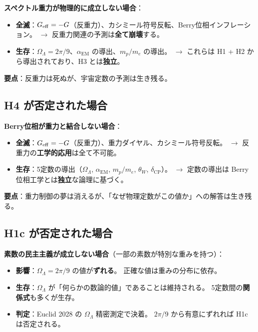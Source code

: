 \begin{warningbox}[H3否定の波及]
\textbf{スペクトル重力が物理的に成立しない場合}：
\begin{itemize}
  \item \textbf{全滅}：$G_{\mathrm{eff}} = -G$（反重力）、カシミール符号反転、Berry位相インフレーション。
        $\to$ 反重力関連の予測は\textbf{全て崩壊}する。
  \item \textbf{生存}：$\Omega_\Lambda = 2\pi/9$、$\alpha_{\mathrm{EM}}$ の導出、$m_p/m_e$ の導出。
        $\to$ これらは H1 + H2 から導出されており、H3 とは\textbf{独立}。
\end{itemize}
\textbf{要点}：反重力は死ぬが、宇宙定数の予測は生き残る。
\end{warningbox}

\subsection{H4 が否定された場合}

\begin{warningbox}[H4否定の波及]
\textbf{Berry位相が重力と結合しない場合}：
\begin{itemize}
  \item \textbf{全滅}：$G_{\mathrm{eff}} = -G$（反重力）、重力ダイヤル、カシミール符号反転。
        $\to$ 反重力の\textbf{工学的応用}は全て不可能。
  \item \textbf{生存}：5定数の導出（$\Omega_\Lambda$, $\alpha_{\mathrm{EM}}$, $m_p/m_e$, $\theta_W$, $\delta_{\mathrm{CP}}$）。
        $\to$ 定数の導出は Berry 位相工学とは\textbf{独立}な論理に基づく。
\end{itemize}
\textbf{要点}：重力制御の夢は消えるが、「なぜ物理定数がこの値か」への解答は生き残る。
\end{warningbox}

\subsection{H1c が否定された場合}

\begin{warningbox}[H1c否定の波及]
\textbf{素数の民主主義が成立しない場合}（一部の素数が特別な重みを持つ）：
\begin{itemize}
  \item \textbf{影響}：$\Omega_\Lambda = 2\pi/9$ の値が\textbf{ずれる}。
        正確な値は重みの分布に依存。
  \item \textbf{生存}：$\Omega_\Lambda$ が「何らかの数論的値」であることは維持される。
        5定数間の\textbf{関係式}も多くが生存。
  \item \textbf{判定}：Euclid 2028 の $\Omega_\Lambda$ 精密測定で決着。
        $2\pi/9$ から有意にずれれば H1c は否定される。
\end{itemize}
\end{warningbox}

